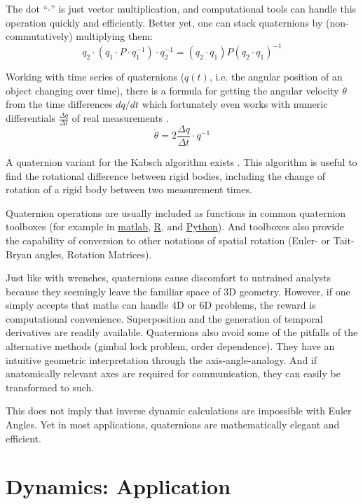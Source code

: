 \documentclass[10pt,a4paper]{article}
\begin{document}
The dot ``\(\cdot\)'' is just vector multiplication, and computational tools can handle this operation quickly and efficiently.
Better yet, one can stack quaternions by (non-commutatively) multiplying them:
\[ q_2 \cdot \left( q_1\cdot P\cdot q_1^{-1}\right) \cdot q_2^{-1} = (q_2\cdot q_1) P (q_2\cdot q_1)^{-1} \]

Working with time series of quaternions (\(q(t)\), i.e. the angular position of an object changing over time), there is a formula for getting the angular velocity \(\dot \theta\) from the time differences \(dq/dt\) which fortunately even works with numeric differentials \(\frac{\Delta q}{\Delta t}\) of real measurements \citep{Baker1999}.
\[\dot \theta = 2 \frac{\Delta q}{\Delta t} \cdot q^{-1} \]

A quaternion variant for the Kabsch algorithm exists \citep{Kabsch1976,Lawrence2019,Kneller1991}.
This algorithm is useful to find the rotational difference between rigid bodies, including the change of rotation of a rigid body between two measurement times.


Quaternion operations are usually included as functions in common quaternion toolboxes (for example in \href{https://www.mathworks.com/discovery/quaternion.html}{matlab}, \href{https://cran.r-project.org/web/packages/onion/onion.pdf}{R}, and \href{https://pypi.org/project/numpy-quaternion}{Python}).
And toolboxes also provide the capability of conversion to other notations of spatial rotation (Euler- or Tait-Bryan angles, Rotation Matrices).


Just like with wrenches, quaternions cause discomfort to untrained analysts because they seemingly leave the familiar space of 3D geometry.
However, if one simply accepts that maths can handle 4D or 6D problems, the reward is computational convenience.
Superposition and the generation of temporal derivatives are readily available.
Quaternions also avoid some of the pitfalls of the alternative methods (gimbal lock problem, order dependence).
They have an intuitive geometric interpretation through the axis-angle-analogy.
And if anatomically relevant axes are required for communication, they can easily be transformed to such.

This does not imply that inverse dynamic calculations are impossible with Euler Angles.
Yet in most applications, quaternions are mathematically elegant and efficient.


\section{Dynamics: Application}
\label{sec:orgf122792}
\end{document}
